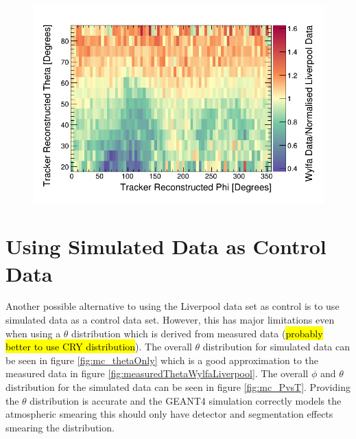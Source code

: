 \begin{figure}[htbp]
 \centering
 \includegraphics[width=\linewidth]{Chapter5/Figs/cosmicTrackerUncertainties/20CutRatioWylfaDivLiv.png}
 \label{fig:20CutRatioWylfaDivLiv}
\end{figure}

\section{Using Simulated Data as Control Data}\label{sec:usingSimulatedDataAsControlData}
Another possible alternative to using the Liverpool data set as control is to use simulated data as a control data set. However, this has major limitations even when using a $\theta$ distribution which is derived from measured data (\hl{probably better to use CRY distribution}). The overall $\theta$ distribution for simulated data can be seen in figure \ref{fig:mc_thetaOnly} which is a good approximation to the measured data in figure \ref{fig:measuredThetaWylfaLiverpool}. The overall $\phi$ and $\theta$ distribution for the simulated data can be seen in figure \ref{fig:mc_PvsT}. Providing the $\theta$ distribution is accurate and the GEANT4 simulation correctly models the atmospheric smearing this should only have detector and segmentation effects smearing the distribution. 

